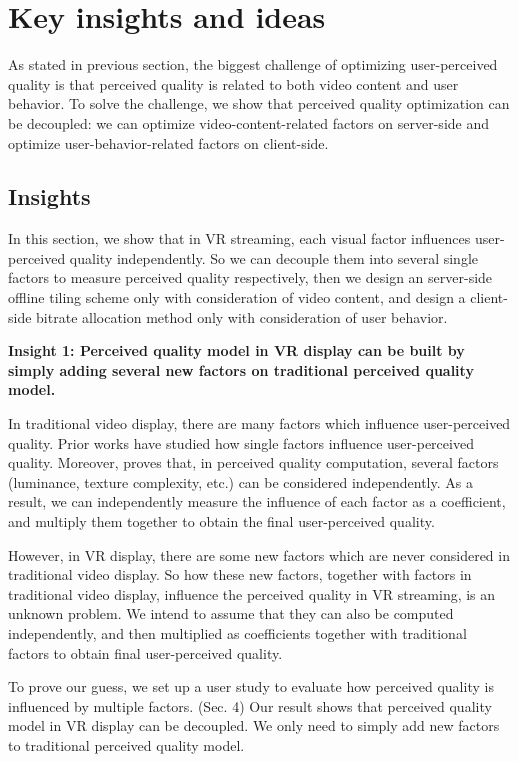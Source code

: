 \section{Key insights and ideas}

As stated in previous section, the biggest challenge of optimizing user-perceived quality is that perceived quality is related to both video content and user behavior. To solve the challenge, we show that perceived quality optimization can be decoupled: we can optimize video-content-related factors on server-side and optimize user-behavior-related factors on client-side.

\subsection{Insights}
In this section, we show that in VR streaming, each visual factor influences user-perceived quality independently. So we can decouple them into several single factors to measure perceived quality respectively, then we design an server-side offline tiling scheme only with consideration of video content, and design a client-side bitrate allocation method only with consideration of user behavior.

\textbf{Insight 1: Perceived quality model in VR display can be built by simply adding several new factors on traditional perceived quality model.}

In traditional video display, there are many factors which influence user-perceived quality. Prior works have studied how single factors influence user-perceived quality. Moreover, \cite{distance} proves that, in perceived quality computation, several factors (luminance, texture complexity, etc.) can be considered independently. As a result, we can independently measure the influence of each factor as a coefficient, and multiply them together to obtain the final user-perceived quality.

However, in VR display, there are some new factors which are never considered in traditional video display. So how these new factors, together with factors in traditional video display, influence the perceived quality in VR streaming, is an unknown problem. We intend to assume that they can also be computed independently, and then multiplied as coefficients together with traditional factors to obtain final user-perceived quality.

To prove our guess, we set up a user study to evaluate how perceived quality is influenced by multiple factors. (Sec. 4) Our result shows that perceived quality model in VR display can be decoupled. We only need to simply add new factors to traditional perceived quality model.

